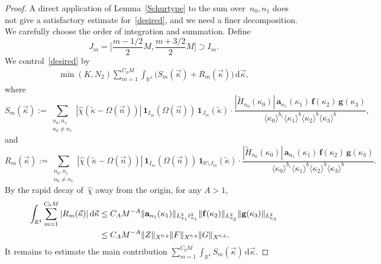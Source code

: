 \documentclass[11pt,reqno,english]{amsart}
\numberwithin{equation}{section}
\theoremstyle{plain}
\theoremstyle{definition}
\theoremstyle{remark}
\newcommand{\la}{\langle}
\newcommand{\ra}{\rangle}
\begin{document}
\begin{proof}
	A direct application of Lemma~\ref{Schurtype} to the sum over~$n_0,n_1$ does not give a satisfactory estimate for~\eqref{desired}, and we need a finer decomposition. We carefully choose the order of integration and summation.
	Define
	\[
	J_m=\Big[\frac{m-1/2}{2}M, \frac{m+3/2}{2}M\Big]\supset I_m.
	\]
	We control~\eqref{desired} by
	\begin{align}\label{S_m+R_m}
		\min(K,N_2)\sum_{m=1}^{C_0 M}\int_{\mathbb{R}^4}\big(S_m(\vec{\kappa}) +R_m(\vec{\kappa})\big)\, \mathrm{d}\vec{\kappa},
	\end{align}
	where
	\[
	S_m(\vec{\kappa}):=\sum_{\substack{n_0,n_1\\
			n_0\neq n_1}}|\widehat{\chi}(\widetilde{\kappa}-\Omega(\vec{n}))|\,\mathbf{1}_{I_m}(\Omega(\vec{n}))\,\mathbf{1}_{J_m}(\widetilde{\kappa})\cdot\frac{
		|\widetilde{H}_{n_0}(\kappa_0)|\,\mathbf{a}_{n_1}(\kappa_1)\,
		\mathbf{f}(\kappa_2)\,\mathbf{g}(\kappa_3)}{\la\kappa_0\ra^{b_1}\la\kappa_1\ra^b\la\kappa_2\ra^b\la\kappa_3\ra^b},
	\]
	and
	\[
	R_m(\vec{\kappa}):=\sum_{\substack{n_0,n_1\\
			n_0\neq n_1}}|\widehat{\chi}(\widetilde{\kappa}-\Omega(\vec{n}))|\,\mathbf{1}_{I_m}(\Omega(\vec{n}))\,\mathbf{1}_{\mathbb{R}\setminus J_m}(\widetilde{\kappa})\cdot\frac{
		|\widetilde{H}_{n_0}(\kappa_0)|\,\mathbf{a}_{n_1}(\kappa_1)\,
		\mathbf{f}(\kappa_2)\,\mathbf{g}(\kappa_3)}{\la\kappa_0\ra^{b_1}\la\kappa_1\ra^b\la\kappa_2\ra^b\la\kappa_3\ra^b}.
	\]
	By the rapid decay of~$\widehat{\chi}$ away from the origin, for any $A>1$,
	\begin{align}\label{Rm}
		\int_{\mathbb{R}^4} \sum_{m=1}^{C_0 M}|R_m(\vec{\kappa})|\, \mathrm{d}\vec{\kappa} &\leq C_A M^{-A}\|\mathbf{a}_{n_1}(\kappa_1)\|_{L_{\kappa_1}^2\ell_{n_1}^2}
		\|\mathbf{f}(\kappa_2)\|_{L_{\kappa_2}^2}\|\mathbf{g}(\kappa_3)\|_{L_{\kappa_3}^2}\notag \\
		&\leq C_A M^{-A}\|Z\|_{X^{0,b}}\|F\|_{X^{0,b}}\|G\|_{X^{0,b}}.
	\end{align}
	It remains to estimate the main contribution $\sum_{m=1}^{C_0 M}\int_{\mathbb{R}^4}S_m(\vec{\kappa})\,\mathrm{d}\vec{\kappa}$.


\end{proof}
\end{document}
